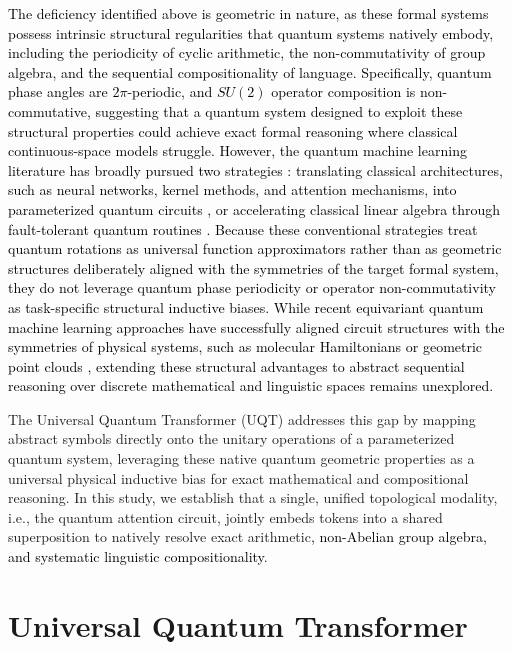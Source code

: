 \documentclass[11pt, a4paper]{article}
\begin{document}
\textcolor{black}{The deficiency identified above is geometric in nature, as these formal systems possess intrinsic structural regularities that quantum systems natively embody, including the periodicity of cyclic arithmetic, the non-commutativity of group algebra, and the sequential compositionality of language. Specifically, quantum phase angles are $2\pi$-periodic, and $SU(2)$ operator composition is non-commutative, suggesting that a quantum system designed to exploit these structural properties could achieve exact formal reasoning where classical continuous-space models struggle. However,} \textcolor{black}{the quantum machine learning literature has broadly pursued two strategies \cite{biamonte2017quantum, cerezo2022challenges, peral2024systematic}: translating classical architectures, such as neural networks, kernel methods, and attention mechanisms, into parameterized quantum circuits \cite{lakhdar2025benchmarking, zhang2025survey, li2024quantum}, or accelerating classical linear algebra through fault-tolerant quantum routines \cite{guo2024quantum, khatri2024quixer}.} \textcolor{black}{Because these conventional strategies treat quantum rotations as universal function approximators rather than as geometric structures deliberately aligned with the symmetries of the target formal system, they do not leverage quantum phase periodicity or operator non-commutativity as task-specific structural inductive biases. While recent equivariant quantum machine learning approaches have successfully aligned circuit structures with the symmetries of physical systems, such as molecular Hamiltonians or geometric point clouds \cite{larocca2022group, meyer2023exploiting}, extending these structural advantages to abstract sequential reasoning over discrete mathematical and linguistic spaces remains unexplored.} 

The Universal Quantum Transformer (UQT) addresses this gap by mapping abstract symbols directly onto the unitary operations of a parameterized quantum system, leveraging these native quantum geometric properties as a universal physical inductive bias for exact mathematical and compositional reasoning. In this study, we establish that a single, unified topological modality, i.e., the quantum attention circuit, jointly embeds tokens into a shared superposition to natively resolve exact arithmetic\textcolor{black}{, non-Abelian group algebra, and systematic linguistic compositionality}.

\section*{Universal Quantum Transformer}
\end{document}
